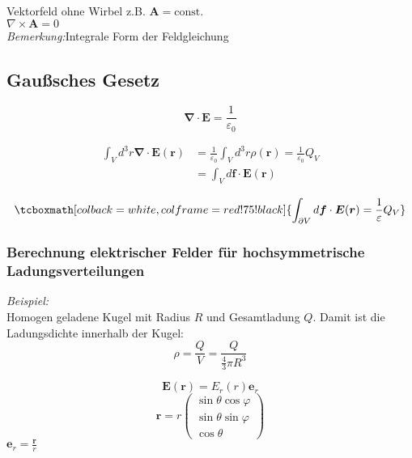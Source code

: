 \documentclass[titlepage,11pt,a4paper,ngerman]{report}
\newcommand{\tx}[1]{\textrm{#1}}
\newcommand{\const}{\tx{const.}}
\renewcommand{\vec}[1]{\boldsymbol{#1}}
\renewcommand{\epsilon}{\varepsilon}
\newcommand{\bem}[1]{\emph{Bemerkung:}}
\newcommand{\rmbox}[1]{\tcboxmath[colback=white,colframe=red!75!black]{#1}}
\begin{document}
Vektorfeld ohne Wirbel z.B. $\vec{A} = \const$\\ %
$\nabla \times \vec{A} = 0$\\ %
\bem  %

\subsection{Integrale Form der Feldgleichung}
\subsection{Gaußsches Gesetz}
\begin{equation*}
\vec{\nabla} \cdot \vec{E} = \frac{1}{\epsilon_0}
\end{equation*}


\begin{align*}
\int_{V} d^3 r \vec{\nabla} \cdot \vec{E}(\vec{r}) &= \frac{1}{\epsilon_0} \int_{V} d^3 r \rho (\vec{r}) = \frac{1}{\epsilon_0} Q_V\\
&= \int_V d\vec{f} \cdot \vec{E}(\vec{r})
\end{align*}

\begin{equation*}
\rmbox{\int_{\partial V} d \vec{f} \cdot \vec{E}(\vec{r}) = \frac{1}{\epsilon} Q_V}
\end{equation*}

\subsubsection{Berechnung elektrischer Felder für hochsymmetrische Ladungsverteilungen}
\emph{Beispiel:}\\
Homogen geladene Kugel mit Radius $ R $ und Gesamtladung $ Q $. Damit ist die Ladungsdichte innerhalb der Kugel:
\begin{equation*}
\rho = \frac{Q}{V} = \frac{Q}{\frac{4}{3} \pi R^3}
\end{equation*}


\begin{equation*}
\vec{E}(\vec{r}) = E_r (r) \vec{e}_r
\end{equation*}
\begin{equation*}
\vec{r} = r \begin{pmatrix}
\sin \theta \cos \varphi \\ \sin \theta \sin \varphi \\ \cos \theta
\end{pmatrix}
\end{equation*}
$ \vec{e}_r = \frac{\vec{r}}{r} $
\end{document}
